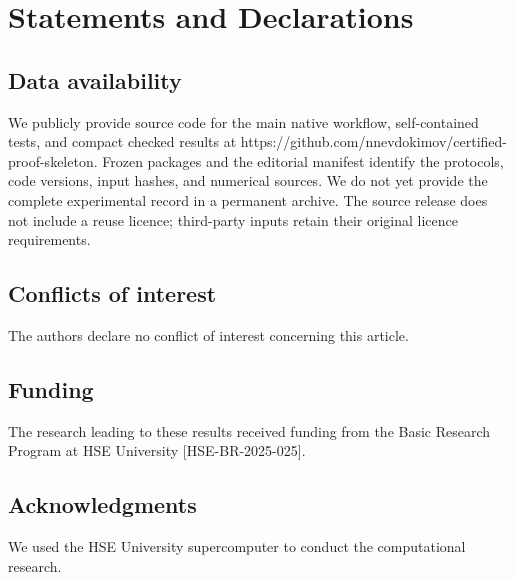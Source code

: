 \documentclass[pdflatex,sn-basic,Numbered]{sn-jnl}
\begin{document}
\section*{Statements and Declarations}

\subsection*{Data availability}\label{data-availability}

We publicly provide source code for the main native workflow, self-contained tests, and compact checked results at https://github.com/nnevdokimov/certified-proof-skeleton. Frozen packages and the editorial manifest identify the protocols, code versions, input hashes, and numerical sources. We do not yet provide the complete experimental record in a permanent archive. The source release does not include a reuse licence; third-party inputs retain their original licence requirements.

\subsection*{Conflicts of interest}\label{conflicts-of-interest}

The authors declare no conflict of interest concerning this article.

\subsection*{Funding}\label{funding}

The research leading to these results received funding from the Basic Research Program at HSE University {[}HSE-BR-2025-025{]}.

\subsection*{Acknowledgments}\label{acknowledgments}

We used the HSE University supercomputer to conduct the computational research.
\end{document}
